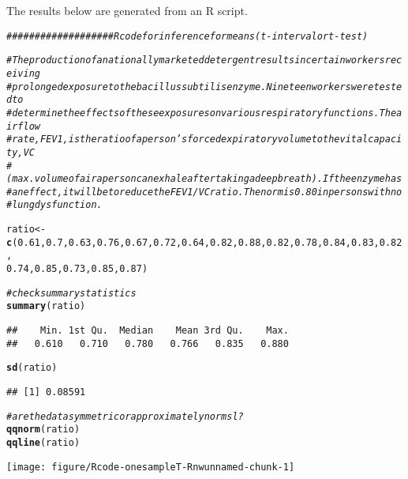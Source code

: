 \documentclass{article}\usepackage[]{graphicx}\usepackage[]{color}
\makeatletter
\newcommand{\hlnum}[1]{\textcolor[rgb]{0.686,0.059,0.569}{#1}}%
\newcommand{\hlcom}[1]{\textcolor[rgb]{0.678,0.584,0.686}{\textit{#1}}}%
\newcommand{\hlstd}[1]{\textcolor[rgb]{0.345,0.345,0.345}{#1}}%
\newcommand{\hlkwb}[1]{\textcolor[rgb]{0.69,0.353,0.396}{#1}}%
\newcommand{\hlkwd}[1]{\textcolor[rgb]{0.737,0.353,0.396}{\textbf{#1}}}%
\newenvironment{kframe}{%
 \def\at@end@of@kframe{}%
 \ifinner\ifhmode%
  \def\at@end@of@kframe{\end{minipage}}%
  \begin{minipage}{\columnwidth}%
 \fi\fi%
 \def\FrameCommand##1{\hskip\@totalleftmargin \hskip-\fboxsep
 \colorbox{shadecolor}{##1}\hskip-\fboxsep
     \hskip-\linewidth \hskip-\@totalleftmargin \hskip\columnwidth}%
 \MakeFramed {\advance\hsize-\width
   \@totalleftmargin\z@ \linewidth\hsize
   \@setminipage}}%
 {\par\unskip\endMakeFramed%
 \at@end@of@kframe}
\newenvironment{knitrout}{}{} %
\makeatother
\begin{document}
The results below are generated from an R script.

\begin{knitrout}
\color{fgcolor}\begin{kframe}
\begin{alltt}
\hlcom{################### Rcode for inference for means (t-interval or t-test)}

\hlcom{# The production of a nationally marketed detergent results in certain workers receiving}
\hlcom{# prolonged exposure to the bacillus subtilis enzyme. Nineteen workers were tested to}
\hlcom{# determine the effects of these exposures on various respiratory functions.  The airflow}
\hlcom{# rate, FEV1, is the ratio of a person’s forced expiratory volume to the vital capacity, VC}
\hlcom{# (max. volume of air a person can exhale after taking a deep breath).  If the enzyme has}
\hlcom{# an effect, it will be to reduce the FEV1/VC ratio. The norm is 0.80 in persons with no}
\hlcom{# lung dysfunction.}

\hlstd{ratio} \hlkwb{<-} \hlkwd{c}\hlstd{(}\hlnum{0.61}\hlstd{,} \hlnum{0.7}\hlstd{,} \hlnum{0.63}\hlstd{,} \hlnum{0.76}\hlstd{,} \hlnum{0.67}\hlstd{,} \hlnum{0.72}\hlstd{,} \hlnum{0.64}\hlstd{,} \hlnum{0.82}\hlstd{,} \hlnum{0.88}\hlstd{,} \hlnum{0.82}\hlstd{,} \hlnum{0.78}\hlstd{,} \hlnum{0.84}\hlstd{,} \hlnum{0.83}\hlstd{,} \hlnum{0.82}\hlstd{,}
    \hlnum{0.74}\hlstd{,} \hlnum{0.85}\hlstd{,} \hlnum{0.73}\hlstd{,} \hlnum{0.85}\hlstd{,} \hlnum{0.87}\hlstd{)}

\hlcom{# check summary statistics}
\hlkwd{summary}\hlstd{(ratio)}
\end{alltt}
\begin{verbatim}
##    Min. 1st Qu.  Median    Mean 3rd Qu.    Max. 
##   0.610   0.710   0.780   0.766   0.835   0.880
\end{verbatim}
\begin{alltt}
\hlkwd{sd}\hlstd{(ratio)}
\end{alltt}
\begin{verbatim}
## [1] 0.08591
\end{verbatim}
\begin{alltt}
\hlcom{# are the data symmetric or approximately normsl?}
\hlkwd{qqnorm}\hlstd{(ratio)}
\hlkwd{qqline}\hlstd{(ratio)}
\end{alltt}
\end{kframe}

{\centering \texttt{[image: figure/Rcode-onesampleT-Rnwunnamed-chunk-1]} 

}
\end{knitrout}
\end{document}
